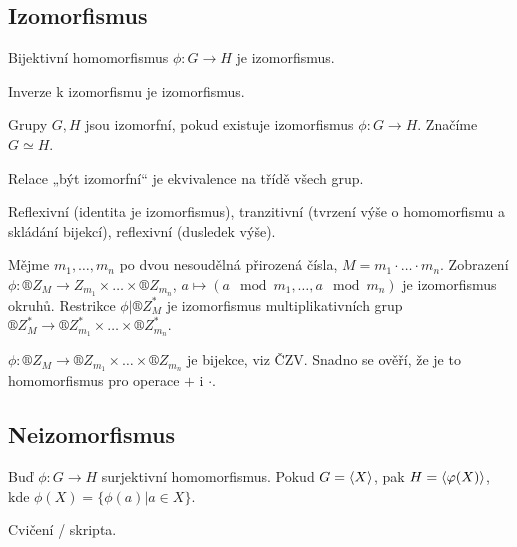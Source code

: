 \documentclass[12pt]{article}                   %
\begin{document}
    \subsection{Izomorfismus}
        \begin{definice}[Izomorfismus]
            Bijektivní homomorfismus $\phi: G \rightarrow H$ je izomorfismus.
        \end{definice}
        
        \begin{dusledek}
            Inverze k izomorfismu je izomorfismus.
        \end{dusledek}
        
        \begin{definice}
            Grupy $G, H$ jsou izomorfní, pokud existuje izomorfismus $\phi: G \rightarrow H$. Značíme $G \simeq H$.
        \end{definice}
        
        \begin{pozorovani}
            Relace „být izomorfní“ je ekvivalence na třídě všech grup.
            
            \begin{dukazin}
                Reflexivní (identita je izomorfismus), tranzitivní (tvrzení výše o homomorfismu a skládání bijekcí), reflexivní (dusledek výše).
            \end{dukazin}
        \end{pozorovani}
        
        \begin{tvrzeni}
            Mějme $m_1, …, m_n$ po dvou nesoudělná přirozená čísla, $M = m_1·…·m_n$. Zobrazení $\phi: ®Z_M \rightarrow Z_{m_1} \times … \times ®Z_{m_n}$, $a \mapsto (a \mod m_1, …, a \mod m_n)$ je izomorfismus okruhů. Restrikce $\phi|®Z_M^*$ je izomorfismus multiplikativních grup $®Z_M^* \rightarrow ®Z_{m_1}^* \times … \times ®Z_{m_n}^*$.
            
            \begin{dukazin}
                $\phi: ®Z_M \rightarrow ®Z_{m_1} \times … \times ®Z_{m_n}$ je bijekce, viz ČZV. Snadno se ověří, že je to homomorfismus pro operace $+$ i $·$.
            \end{dukazin}
        \end{tvrzeni}

    \subsection{Neizomorfismus}
        \begin{tvrzeni}
            Buď $\phi: G \rightarrow H$ surjektivní homomorfismus. Pokud $G = \left\langle X\right\rangle$, pak $H = \left\langle\varphi(X)\right\rangle$, kde $\phi(X) = \{\phi(a) | a \in X\}$.

            \begin{dukazin}
                Cvičení / skripta.
            \end{dukazin}
        \end{tvrzeni}
\end{document}
